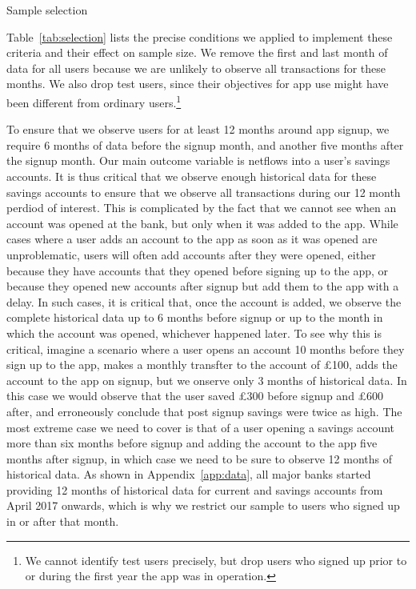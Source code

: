 \begin{table}
\centering
\caption{Sample selection}\label{tab:selection}

\end{table}


Table~\ref{tab:selection} lists the precise conditions we applied to implement
these criteria and their effect on sample size. We remove the first and last
month of data for all users because we are unlikely to observe all transactions
for these months. We also drop test users, since their objectives for app use
might have been different from ordinary users.\footnote{We cannot identify test
users precisely, but drop users who signed up prior to or during the first year
the app was in operation.}

To ensure that we observe users for at least 12 months around app signup, we
require 6 months of data before the signup month, and another five months after
the signup month. Our main outcome variable is netflows into a user's savings
accounts. It is thus critical that we observe enough historical data for these
savings accounts to ensure that we observe all transactions during our 12 month
perdiod of interest. This is complicated by the fact that we cannot see when an
account was opened at the bank, but only when it was added to the app. While
cases where a user adds an account to the app as soon as it was opened are
unproblematic, users will often add accounts after they were opened, either
because they have accounts that they opened before signing up to the app, or
because they opened new accounts after signup but add them to the app with a
delay. In such cases, it is critical that, once the account is added, we
observe the complete historical data up to 6 months before signup or up to the
month in which the account was opened, whichever happened later. To see why
this is critical, imagine a scenario where a user opens an account 10 months
before they sign up to the app, makes a monthly transfter to the account of
\pounds100, adds the account to the app on signup, but we onserve only 3 months
of historical data. In this case we would observe that the user saved
\pounds300 before signup and \pounds600 after, and erroneously conclude that
post signup savings were twice as high. The most extreme case we need to cover
is that of a user opening a savings account more than six months before signup
and adding the account to the app five months after signup, in which case we
need to be sure to observe 12 months of historical data. As shown in
Appendix~\ref{app:data}, all major banks started providing 12 months of
historical data for current and savings accounts from April 2017 onwards, which
is why we restrict our sample to users who signed up in or after that month.

